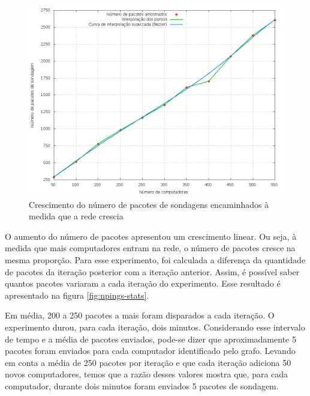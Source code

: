 \begin{figure}[!htb]
    \centering
    \label{fig:npings}
    \includegraphics[width=\linewidth]{img/npings}
    \caption{Crescimento do número de pacotes de sondagens encaminhados 
        à medida que a rede crescia}
\end{figure}

O aumento do número de pacotes apresentou um crescimento linear.
Ou seja, à medida que mais computadores entram na rede, o número de pacotes
cresce na mesma proporção.
Para esse experimento, foi calculada a diferença da quantidade de pacotes da
iteração posterior com a iteração anterior.
Assim, é possível saber quantos pacotes variaram a cada iteração do 
experimento.
Esse resultado é apresentado na figura \ref{fig:npings-stats}. 

Em média, 200 a 250 pacotes a mais foram disparados a cada iteração. 
O experimento durou, para cada iteração, dois minutos. 
Considerando esse intervalo de tempo e a média de pacotes enviados, pode-se 
dizer que aproximadamente 5 pacotes foram enviados para cada computador 
identificado pelo grafo.
Levando em conta a média de 250 pacotes por iteração e que cada iteração 
adiciona 50 novos computadores, temos que a razão desses valores mostra 
que, para cada computador, durante dois minutos foram enviados 5 pacotes 
de sondagem.

